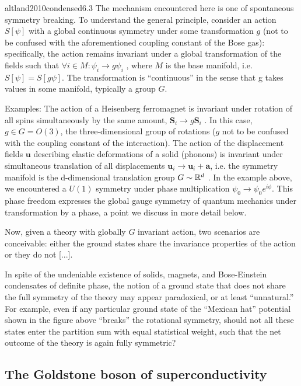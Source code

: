 \begin{cit}{altland2010condensed}{6.3}
    The mechanism encountered here is one of spontaneous symmetry breaking. To understand the general principle, consider an action $S[\psi]$ with a global continuous symmetry under some transformation $g$ (not to be confused with the aforementioned coupling constant of the Bose gas): speciﬁcally, the action remains invariant under a global transformation of the ﬁelds such that $\forall i \in M \colon \psi_i\to g\psi_i$ , where $M$ is the base manifold, i.e. $S[\psi] = S[g\psi]$. The transformation is ``continuous'' in the sense that g takes values in some manifold, typically a group $G$. 
    
    Examples: The action of a Heisenberg ferromagnet is invariant under rotation of all spins simultaneously by the same amount, $\mathbf{S}_i \to g\mathbf{S}_i$ . In this case, $g \in G = O(3)$, the three-dimensional group of rotations ($g$ not to be confused with the coupling constant of the interaction). The action of the displacement ﬁelds $\mathbf{u}$ describing elastic deformations of a solid (phonons) is invariant under simultaneous translation of all displacements $\mathbf{u}_i \to \mathbf{u}_i + \mathbf{a}$, i.e. the symmetry manifold is the d-dimensional translation group $G \sim \mathbb{R}^d$ . In the example above, we encountered a $U(1)$ symmetry under phase multiplication $\psi_0 \to \psi_0 e^{i\phi}$. This phase freedom expresses the global gauge symmetry of quantum mechanics under transformation by a phase, a point we discuss in more detail below.

    Now, given a theory with globally $G$ invariant action, two scenarios are conceivable: either the ground states share the invariance properties of the action or they do not [...].

    In spite of the undeniable existence of solids, magnets, and Bose-Einstein condensates of deﬁnite phase, the notion of a ground state that does not share the full symmetry of the theory may appear paradoxical, or at least “unnatural.” For example, even if any particular ground state of the “Mexican hat” potential shown in the ﬁgure above “breaks” the rotational symmetry, should not all these states enter the partition sum with equal statistical weight, such that the net outcome of the theory is again fully symmetric?
\end{cit}

\subsection{The Goldstone boson of superconductivity}

